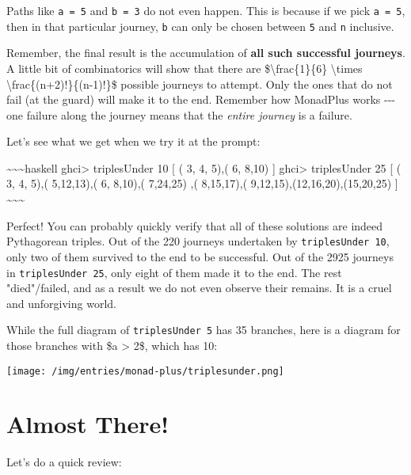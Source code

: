 \documentclass[]{article}
\begin{document}
Paths like \texttt{a\ =\ 5} and \texttt{b\ =\ 3} do not even happen. This is
because if we pick \texttt{a\ =\ 5}, then in that particular journey, \texttt{b}
can only be chosen between \texttt{5} and \texttt{n} inclusive.

Remember, the final result is the accumulation of \textbf{all such successful
journeys}. A little bit of combinatorics will show that there are
\$\textbackslash{}frac\{1\}\{6\} \textbackslash{}times
\textbackslash{}frac\{(n+2)!\}\{(n-1)!\}\$ possible journeys to attempt. Only
the ones that do not fail (at the guard) will make it to the end. Remember how
MonadPlus works -\/-\/- one failure along the journey means that the
\emph{entire journey} is a failure.

Let's see what we get when we try it at the prompt:

\textasciitilde{}\textasciitilde{}\textasciitilde{}haskell ghci\textgreater{}
triplesUnder 10 {[} ( 3, 4, 5),( 6, 8,10) {]} ghci\textgreater{} triplesUnder 25
{[} ( 3, 4, 5),( 5,12,13),( 6, 8,10),( 7,24,25) ,( 8,15,17),(
9,12,15),(12,16,20),(15,20,25) {]}
\textasciitilde{}\textasciitilde{}\textasciitilde{}

Perfect! You can probably quickly verify that all of these solutions are indeed
Pythagorean triples. Out of the 220 journeys undertaken by
\texttt{triplesUnder\ 10}, only two of them survived to the end to be
successful. Out of the 2925 journeys in \texttt{triplesUnder\ 25}, only eight of
them made it to the end. The rest "died"/failed, and as a result we do not even
observe their remains. It is a cruel and unforgiving world.

While the full diagram of \texttt{triplesUnder\ 5} has 35 branches, here is a
diagram for those branches with \$a \textgreater{} 2\$, which has 10:

\texttt{[image: /img/entries/monad-plus/triplesunder.png]}

\section{Almost There!}

Let's do a quick review:
\end{document}
